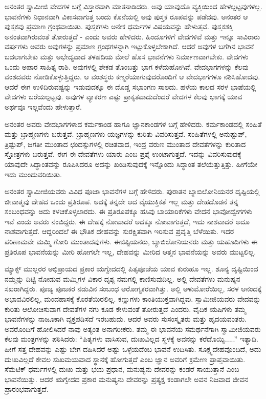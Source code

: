 ಅನಂತರ ಸ್ವಾಮೀಜಿ ವೇದಗಳ ಬಗ್ಗೆ ವಿಸ್ತಾರವಾಗಿ ಮಾತನಾಡಿದರು. ಅವು ಯಾವುದೊ ವ್ಯಕ್ತಿಯಿಂದ ಹೇಳಲ್ಪಟ್ಟವುಗಳಲ್ಲ. ಭಾವನೆಗಳು ನಿಧಾನವಾಗಿ ವಿಕಾಸವಾಗುತ್ತ ಬಂದು ಕೊನೆಯಲ್ಲಿ ಅವು ಪುಸ್ತಕ ರೂಪವನ್ನು ಪಡೆದವು. ಅನಂತರ ಆ ಪುಸ್ತಕವು ಪ್ರಮಾಣ ಗ್ರಂಥವಾಯಿತು. ಪುಸ್ತಕಗಳು ಅನೇಕ ಧರ್ಮಗಳ ವಿಷಯವನ್ನು ಹೇಳುತ್ತವೆ. ಪುಸ್ತಕಶಕ್ತಿ ಅನಂತವಾಗಿರುವಂತೆ ತೋರುತ್ತದೆ - ಎಂದು ಅವರು ಹೇಳಿದರು. ಹಿಂದೂಗಳಿಗೆ ವೇದಗಳಿವೆ ಮತ್ತು ಇನ್ನೂ ಸಾವಿರಾರು ವರ್ಷಗಳು ಅವರು ಅವುಗಳನ್ನು ಪ್ರಮಾಣ ಗ್ರಂಥಗಳನ್ನಾಗಿ ಇಟ್ಟುಕೊಳ್ಳಬೇಕಾಗಿದೆ. ಆದರೆ ಅವುಗಳ ಬಗೆಗಿನ ಭಾವನೆ ಬದಲಾಗಬೇಕು ಮತ್ತು ಅಭೇದ್ಯವಾದ ತಳಹದಿಯ ಮೇಲೆ ಹೊಸ ಭಾವನೆಗಳು ನಿರ್ಮಾಣವಾಗಬೇಕು. ವೇದಗಳು ಒಂದು ಅಪಾರ ಸಾಹಿತ್ಯ ರಾಶಿ. ಅವುಗಳಲ್ಲಿ ಶೇಕಡ ತೊಂಬತ್ತು ಭಾಗ ಕಳೆದುಹೋಗಿವೆ. ವೇದಭಾಗಗಳನ್ನು ಕೆಲವು ವಂಶದವರು ನೋಡಿಕೊಳ್ಳುತ್ತಿದ್ದರು. ಆ ವಂಶಸ್ಥರು ಕಣ್ಮರೆಯಾಗುವುದರೊಂದಿಗೆ ಆ ವೇದಭಾಗಗಳೂ ನಶಿಸಿಹೋದವು. ಆದರೆ ಈಗ ಉಳಿದಿರುವಷ್ಟನ್ನು ಇಡುವುದಕ್ಕೂ ಈ ದೊಡ್ಡ ಸಭಾಂಗಣ ಸಾಲದು. ಹಳೆಯ ಕಾಲದ ಸರಳ ಭಾಷೆಯಲ್ಲಿ ವೇದಗಳು ಬರೆಯಲ್ಪಟ್ಟವು. ಅವುಗಳ ವ್ಯಾಕರಣ ಎಷ್ಟು ಪ್ರಾಕೃತವಾದುದೆಂದರೆ ವೇದಗಳ ಕೆಲವು ಭಾಗಕ್ಕೆ ಯಾವ ಅರ್ಥವೂ ಇಲ್ಲವೆಂದು ಹೇಳುತ್ತಾರೆ.

ಅನಂತರ ಅವರು ವೇದಭಾಗಗಳಾದ ಕರ್ಮಕಾಂಡ ಹಾಗೂ ಜ್ಞಾನಕಾಂಡಗಳ ಬಗ್ಗೆ ಹೇಳಿದರು. ಕರ್ಮಕಾಂಡದಲ್ಲಿ ಸಂಹಿತೆ ಮತ್ತು ಬ್ರಾಹ್ಮಣಗಳು ಬರುತ್ತವೆ. ಬ್ರಾಹ್ಮಣಗಳು ಯಜ್ಞಗಳನ್ನು ಕುರಿತು ವಿವರಿಸುತ್ತವೆ. ಸಂಹಿತೆಗಳಲ್ಲಿ ಅನುಷ್ಟುಪ್​, ತ್ರಿಷ್ಟುಪ್​, ಜಗತೀ ಮುಂತಾದ ಛಂದಸ್ಸುಗಳಲ್ಲಿ ರಚಿತವಾದ, ಇಂದ್ರ ವರುಣ ಮುಂತಾದ ದೇವತೆಗಳನ್ನು ಕುರಿತಾದ ಸ್ತೋತ್ರಗಳು ಬರುತ್ತವೆ. ಈಗ ಈ ದೇವತೆಗಳು ಯಾರು ಎಂಬ ಪ್ರಶ್ನೆ ಉಂಟಾಗುತ್ತದೆ. ಇದನ್ನು ವಿವರಿಸುವುದಕ್ಕೆ ಯಾವುದೇ ಸಿದ್ಧಾಂತವನ್ನು ರೂಪಿಸಿದರೂ ಅದನ್ನು ಖಂಡಿಸುವುದಕ್ಕೆ ಇನ್ನೊಂದು ಸಿದ್ಧಾಂತ ತಲೆಯೆತ್ತುತ್ತಿತ್ತು. ಹೀಗೆಯೇ ಇದು ಮುಂದುವರಿಯಿತು.

ಅನಂತರ ಸ್ವಾಮೀಜಿಯವರು ವಿವಿಧ ಪೂಜಾ ಭಾವನೆಗಳ ಬಗ್ಗೆ ಹೇಳಿದರು. ಪುರಾತನ ಬ್ಯಾಬಿಲೋನಿಯನರ ದೃಷ್ಟಿಯಲ್ಲಿ ಜೀವಾತ್ಮವು ದೇಹದ ಒಂದು ಪ್ರತಿರೂಪ. ಅದಕ್ಕೆ ತನ್ನದೇ ಆದ ವೈಯುಕ್ತಿಕತೆ ಇಲ್ಲ ಮತ್ತು ದೇಹದೊಡನೆ ತನ್ನ ಸಂಬಂಧವನ್ನು ಅದು ಕಳಚಿಕೊಳ್ಳಲಾರದು. ಈ ಪ್ರತಿರೂಪಕ್ಕೂ ಹಸಿವು ಬಾಯಾರಿಕೆಗಳು ವೇದನೆ ಭಾವೋದ್ವೇಗಗಳು ಇವೆ ಎಂದು ಅವರು ನಂಬಿದ್ದರು. ಈ ದೇಹಕ್ಕೆ ನೋವಾದರೆ ಅದಕ್ಕೂ ನೋವಾಗುತ್ತದೆ, ಇದು ನಾಶವಾದರೆ ಅದೂ ನಾಶವಾಗುತ್ತದೆ. ಆದ್ದರಿಂದಲೆ ಈ ಭೌತಿಕ ದೇಹವನ್ನು ಸುರಕ್ಷಿತವಾಗಿ ಇರಿಸುವ ಪ್ರವೃತ್ತಿ ಬೆಳೆಯಿತು. ಇದರ ಪರಿಣಾಮವೇ ಮಮ್ಮಿ ಗೋರಿ ಮುಂತಾದವುಗಳು. ಈಜಿಪ್ಟಿಯನರು, ಬ್ಯಾಬಿಲೋನಿಯನರು ಮತ್ತು ಯಹೂದಿಗಳು ಈ ಪ್ರತಿರೂಪ ಭಾವನೆಯನ್ನು ಮೀರಿ ಹೋಗಲೇ ಇಲ್ಲ, ದೇಹವನ್ನು ಮೀರಿದ ಆತ್ಮನ ಭಾವನೆಯನ್ನು ಅವರು ಮುಟ್ಟಲಿಲ್ಲ.

ಮ್ಯಾಕ್ಸ್ ಮುಲ್ಲರರ ಅಭಿಪ್ರಾಯದ ಪ್ರಕಾರ ಋಗ್ವೇದದಲ್ಲಿ ಪಿತೃಪೂಜೆಯ ಯಾವ ಕುರುಹೂ ಇಲ್ಲ. ಶೂನ್ಯ ದೃಷ್ಟಿಯಿಂದ ನಮ್ಮನ್ನು ದಿಟ್ಟಿ ನೋಡುವ ಮಮ್ಮಿಗಳ ವಿಕಾರ ದೃಶ್ಯ ನಮಗಲ್ಲಿ ಕಾಣಿಸುವುದಿಲ್ಲ. ಅಲ್ಲಿ ದೇವತೆಗಳು ಮನುಷ್ಯನ ಸಖರಾಗಿದ್ದರು. ಪೂಜ್ಯ ಪೂಜಕರ ನಡುವಿನ ಸಂಬಂಧ ಆರೋಗ್ಯಕರವಾಗಿತ್ತು. ಅಲ್ಲಿ ಅಳುಮೋರೆಯಿಲ್ಲ, ಸರಳ ಆನಂದಕ್ಕೆ ಅಭಾವವಿರಲಿಲ್ಲ, ಮಂದಹಾಸಕ್ಕೆ ಕೊರತೆಯಿರಲಿಲ್ಲ. ಕಣ್ಣುಗಳು ಕಾಂತಿಯುಕ್ತವಾಗಿದ್ದವು. ಸ್ವಾಮೀಜಿಯವರು ವೇದವನ್ನು ಕುರಿತು ಆಲೋಚಿಸುವಾಗ ದೇವತೆಗಳ ನಗು ಕೂಡ ಕೇಳುವಂತೆ ತೋರುತ್ತದೆ ಎಂದರು. ವೈದಿಕ ಋಷಿಗಳು ತಮ್ಮ ಭಾವನೆಗಳನ್ನು ನಾಜೂಕಾಗಿ ವ್ಯಕ್ತಪಡಿಸದೆ ಇರಬಹುದು. ಆದರೆ ಅವರು ಸುಸಂಸ್ಕೃತರು ಮತ್ತು ಹೃದಯವಂತರು. ಅವರೊಂದಿಗೆ ಹೋಲಿಸಿದರೆ ನಾವು ಅತ್ಯಂತ ಅನಾಗರೀಕರು. ತಮ್ಮ ಈ ಭಾವನೆಯ ಸಮರ್ಥನೆಗಾಗಿ ಸ್ವಾಮೀಜಿಯವರು ಕೆಲವು ಮಂತ್ರಗಳನ್ನು ಪಠಿಸಿದರು: “ಪಿತೃಗಳು ವಾಸಿಸುವ, ದುಃಖವಿಲ್ಲದ ಸ್ಥಳಕ್ಕೆ ಅವನನ್ನು ಕರೆದೊಯ್ಯಿ.....” ಇತ್ಯಾದಿ. ಹೀಗೆ ಸತ್ತ ದೇಹವನ್ನು ಎಷ್ಟು ಬೇಗ ದಹಿಸಿದರೆ ಅಷ್ಟು ಒಳ್ಳೆಯದೆಂಬ ಭಾವನೆ ಉದಿಸಿತು. ಸೂಕ್ಷ್ಮದೇಹವೊಂದಿದೆ, ಅದು ದುಃಖವಿಲ್ಲದೆ ಕೇವಲ ಸುಖಮಯವಾದ ಸ್ಥಾನಕ್ಕೆ ಹೋಗುತ್ತದೆ ಎಂಬ ಜ್ಞಾನ ಅವರಿಗೆ ಕ್ರಮೇಣ ಪ್ರಾಪ್ತವಾಯಿತು. ಸೆಮೆಟಿಕ್​ ಧರ್ಮಗಳಲ್ಲಿ ದುಃಖ ಮತ್ತು ಭಯ ಪ್ರಧಾನ, ಮನುಷ್ಯನು ದೇವರನ್ನು ಕಂಡರೆ ಸಾಯುತ್ತಾನೆ ಎಂಬ ಭಾವನೆಯಿತ್ತು. ಆದರೆ ಋಗ್ವೇದದ ಪ್ರಕಾರ ಮನುಷ್ಯನು ದೇವರನ್ನು ಪ್ರತ್ಯಕ್ಷ ಕಂಡಾಗಲೇ ಅವನ ನಿಜವಾದ ಜೀವನ ಪ್ರಾರಂಭವಾಗುತ್ತದೆ.

